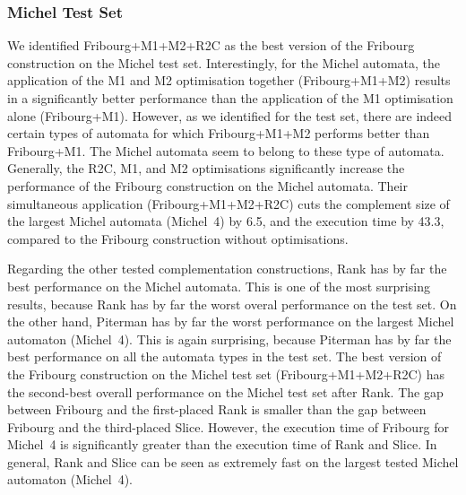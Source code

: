 \subsubsection{Michel Test Set}
We identified Fribourg+M1+M2+R2C as the best version of the Fribourg construction on the Michel test set. Interestingly, for the Michel automata, the application of the M1 and M2 optimisation together (Fribourg+M1+M2) results in a significantly better performance than the application of the M1 optimisation alone (Fribourg+M1). However, as we identified for the \goal{} test set, there are indeed certain types of automata for which Fribourg+M1+M2 performs better than Fribourg+M1. The Michel automata seem to belong to these type of automata. Generally, the R2C, M1, and M2 optimisations significantly increase the performance of the Fribourg construction on the Michel automata. Their simultaneous application (Fribourg+M1+M2+R2C) cuts the complement size of the largest Michel automata (Michel~4) by 6.5, and the execution time by 43.3, compared to the Fribourg construction without optimisations.

Regarding the other tested complementation constructions, Rank has by far the best performance on the Michel automata. This is one of the most surprising results, because Rank has by far the worst overal performance on the \goal{} test set. On the other hand, Piterman has by far the worst performance on the largest Michel automaton (Michel~4). This is again surprising, because Piterman has by far the best performance on all the automata types in the \goal{} test set. The best version of the Fribourg construction on the Michel test set (Fribourg+M1+M2+R2C) has the second-best overall performance on the Michel test set after Rank. The gap between Fribourg and the first-placed Rank is smaller than the gap between Fribourg and the third-placed Slice. However, the execution time of Fribourg for Michel~4 is significantly greater than the execution time of Rank and Slice. In general, Rank and Slice can be seen as extremely fast on the largest tested Michel automaton (Michel~4).




